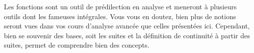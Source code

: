 \documentclass[a4paper, 12pt, french, twoside]{article}
\begin{document}
Les fonctions sont un outil de prédilection en analyse et meneront à plusieurs outils dont les fameuses intégrales. Vous vous en doutez, bien plus de notions seront vues dans vos cours d'analyse avancée que celles présentées ici. Cependant, bien se souvenir des bases, soit les suites et la définition de continuité à partir des suites, permet de comprendre bien des concepts. 
\end{document}
